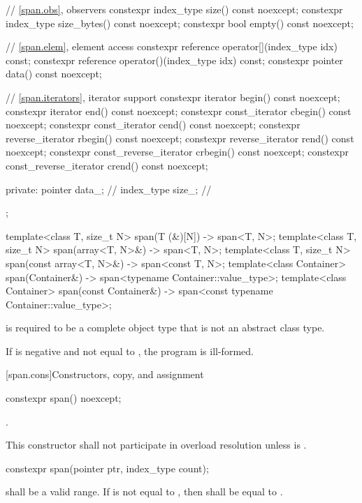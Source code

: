\begin{codeblock}
\begin{codeblock}
\begin{codeblock}
\begin{codeblock}
{{    // \ref{span.obs}, observers
    constexpr index_type size() const noexcept;
    constexpr index_type size_bytes() const noexcept;
    constexpr bool empty() const noexcept;

    // \ref{span.elem}, element access
    constexpr reference operator[](index_type idx) const;
    constexpr reference operator()(index_type idx) const;
    constexpr pointer data() const noexcept;

    // \ref{span.iterators}, iterator support
    constexpr iterator begin() const noexcept;
    constexpr iterator end() const noexcept;
    constexpr const_iterator cbegin() const noexcept;
    constexpr const_iterator cend() const noexcept;
    constexpr reverse_iterator rbegin() const noexcept;
    constexpr reverse_iterator rend() const noexcept;
    constexpr const_reverse_iterator crbegin() const noexcept;
    constexpr const_reverse_iterator crend() const noexcept;

  private:
    pointer data_;    // \expos
    index_type size_; // \expos
  };

  template<class T, size_t N>
    span(T (&)[N]) -> span<T, N>;
  template<class T, size_t N>
    span(array<T, N>&) -> span<T, N>;
  template<class T, size_t N>
    span(const array<T, N>&) -> span<const T, N>;
  template<class Container>
    span(Container&) -> span<typename Container::value_type>;
  template<class Container>
    span(const Container&) -> span<const typename Container::value_type>;
}
\end{codeblock}

\pnum
{} is required to be
a complete object type that is not an abstract class type.

\pnum
If  is negative and not equal to ,
the program is ill-formed.

[span.cons]{Constructors, copy, and assignment}

%
\begin{itemdecl}
constexpr span() noexcept;
\end{itemdecl}
\begin{itemdescr}
\pnum
\postconditions
{}.

\pnum
\remarks
This constructor shall not participate in overload resolution
unless  is .
\end{itemdescr}

%
\begin{itemdecl}
constexpr span(pointer ptr, index_type count);
\end{itemdecl}
\begin{itemdescr}
\pnum
\requires {} shall be a valid range.
If  is not equal to ,
then  shall be equal to .


\end{itemdescr}
\end{codeblock}
\end{codeblock}
\end{codeblock}
